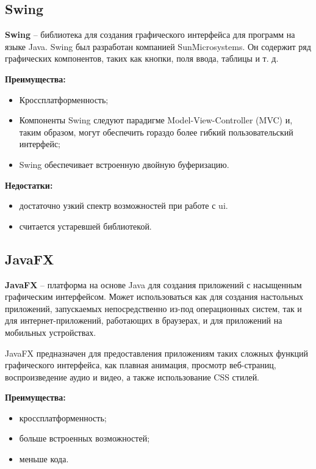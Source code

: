 \subsection{Swing}

\textbf{Swing} -- библиотека для создания графического интерфейса для программ на языке Java. Swing был разработан компанией SunMicrosystems. Он содержит ряд графических компонентов, таких как кнопки, поля ввода, таблицы и т. д.

\textbf{Преимущества:} 
\begin{itemize}
    \item Кроссплатформенность;
    \item Компоненты Swing следуют парадигме Model-View-Controller (MVC) и, таким образом, могут обеспечить гораздо более гибкий пользовательский интерфейс;
    \item Swing обеспечивает встроенную двойную буферизацию.
\end{itemize}

\textbf{Недостатки:} 
\begin{itemize}
	\item достаточно узкий спектр возможностей при работе с ui.
    \item считается устаревшей библиотекой.
\end{itemize}


\subsection{JavaFX}

\textbf{JavaFX} -- платформа на основе Java для создания приложений с насыщенным графическим интерфейсом. Может использоваться как для создания настольных приложений, запускаемых непосредственно из-под операционных систем, так и для интернет-приложений, работающих в браузерах, и для приложений на мобильных устройствах. 

JavaFX предназначен для предоставления приложениям таких сложных функций графического интерфейса, как плавная анимация, просмотр веб-страниц, воспроизведение аудио и видео, а также использование CSS стилей.

\textbf{Преимущества:} 
\begin{itemize}
	\item кроссплатформенность;
    \item больше встроенных возможностей;
    \item меньше кода.
\end{itemize}

